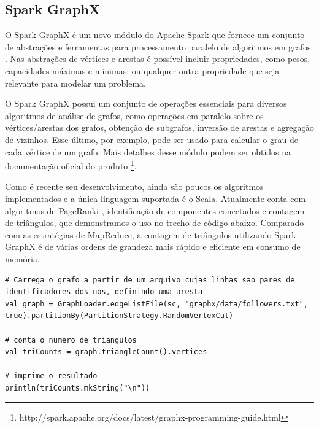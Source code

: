 \subsection{Spark GraphX}

O Spark GraphX é um novo módulo do Apache Spark que fornece um conjunto de abstrações e ferramentas 
para processamento paralelo de algoritmos em grafos \cite{xin2013graphx}. Nas abstrações de 
vértices e arestas é possível 
incluir propriedades, como pesos, capacidades máximas e mínimas; ou qualquer outra propriedade que 
seja relevante para modelar um problema. 

O Spark GraphX possui um conjunto de operações essenciais para diversos algoritmos de análise de grafos, 
como operações em paralelo sobre os vértices/arestas dos grafos, obtenção de subgrafos, inversão de 
arestas e agregação de vizinhos. Esse último, por exemplo, pode ser usado para calcular o grau de cada 
vértice de um grafo. Mais detalhes desse módulo podem ser obtidos na documentação oficial do produto 
\footnote{http://spark.apache.org/docs/latest/graphx-programming-guide.html}. 

Como é recente seu desenvolvimento, ainda são poucos os algoritmos implementados e a única linguagem 
suportada é o Scala. Atualmente conta com algoritmos de PageRanki \cite{brin2012reprint}, identificação 
de componentes conectados e contagem de triângulos, que demonstramos o uso no trecho de código abaixo. 
Comparado com as estratégias de MapReduce, a contagem de triângulos utilizando Spark GraphX é de 
várias ordens de grandeza mais rápido e eficiente em consumo de memória. 

\begin{lstlisting}[style=MyPythonStyle]
# Carrega o grafo a partir de um arquivo cujas linhas sao pares de identificadores dos nos, definindo uma aresta
val graph = GraphLoader.edgeListFile(sc, "graphx/data/followers.txt", true).partitionBy(PartitionStrategy.RandomVertexCut)

# conta o numero de triangulos
val triCounts = graph.triangleCount().vertices

# imprime o resultado
println(triCounts.mkString("\n"))
\end{lstlisting}
